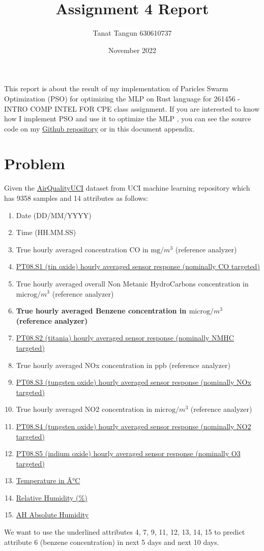 \documentclass{article}
\title{
Assignment 4 Report
}
\author{Tanat Tangun 630610737}
\date{November 2022}
\begin{document}
\maketitle
This report is about the result of my implementation of Paricles Swarm Optimization (PSO) for optimizing the MLP on 
Rust language for 261456 - INTRO COMP INTEL FOR CPE class
assignment.
If you are interested to know how I implement PSO and use it to optimize the MLP
, you can see the source code on my 
\href{https://github.com/RiwEZ/MLPOnRust}{Github repository} or in this document appendix.

\section*{Problem}
Given the \href{https://archive.ics.uci.edu/ml/datasets/air+quality}{AirQualityUCI} dataset from UCI machine learning
repository which has 9358 samples and 14 attributes as follows:
\begin{enumerate}
    \item {Date (DD/MM/YYYY)}
    \item {Time (HH.MM.SS)}
    \item {True hourly averaged concentration CO in $\text{mg}/m^3$ (reference analyzer)}
    \item {\underline{PT08.S1 (tin oxide) hourly averaged sensor response (nominally CO targeted)}}
    \item {True hourly averaged overall Non Metanic HydroCarbons concentration in $\text{microg}/m^3$ (reference analyzer)}
    \item {\textbf{True hourly averaged Benzene concentration in $\text{microg}/m^3$ (reference analyzer)}}
    \item {\underline{PT08.S2 (titania) hourly averaged sensor response (nominally NMHC targeted)}}
    \item {True hourly averaged NOx concentration in ppb (reference analyzer)}
    \item {\underline{PT08.S3 (tungsten oxide) hourly averaged sensor response (nominally NOx targeted)}}
    \item {True hourly averaged NO2 concentration in $\text{microg}/m^3$ (reference analyzer)}
    \item {\underline{PT08.S4 (tungsten oxide) hourly averaged sensor response (nominally NO2 targeted)}}
    \item {\underline{PT08.S5 (indium oxide) hourly averaged sensor response (nominally O3 targeted)}}
    \item {\underline{Temperature in Â°C}}
    \item {\underline{Relative Humidity (\%)}}
    \item {\underline{AH Absolute Humidity}}
\end{enumerate}
We want to use the underlined attributes 4, 7, 9, 11, 12, 13, 14, 15 to predict attribute 6 (benzene concentration) 
in next 5 days and next 10 days.
\end{document}
